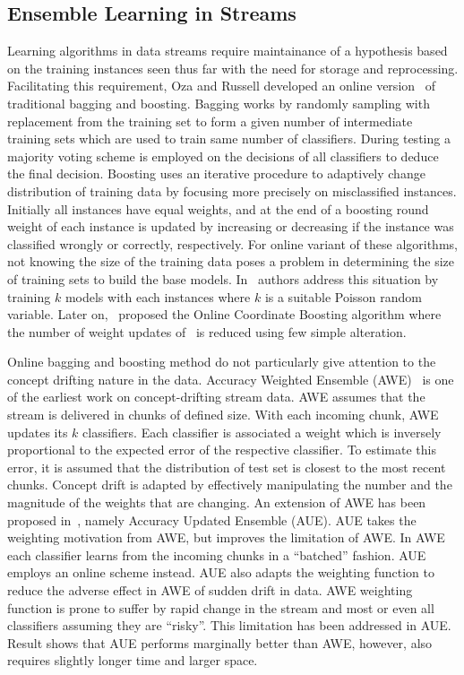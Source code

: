 \subsection{Ensemble Learning in Streams}
Learning algorithms in data streams require maintainance of a hypothesis based on the training instances seen thus far with the need for storage and reprocessing. Facilitating this requirement, Oza and Russell developed an online version~\cite{oza01:obagboost, oza01:thesis} of traditional bagging and boosting. Bagging works by randomly sampling with replacement from the training set to form a given number of intermediate training sets which are used to train same number of classifiers. During testing a majority voting scheme is employed on the decisions of all classifiers to deduce the final decision. Boosting uses an iterative procedure to adaptively change distribution of training data by focusing more precisely on misclassified instances. Initially all instances have equal weights, and at the end of a boosting round weight of each instance is updated by increasing or decreasing if the instance was classified wrongly or correctly, respectively. For online variant of these algorithms, not knowing the size of the training data poses a problem in determining the size of training sets to build the base models. In~\cite{oza01:obagboost} authors address this situation by training $k$ models with each instances where $k$ is a suitable Poisson random variable. Later on,~\cite{pelossof08:boosting} proposed the Online Coordinate Boosting algorithm where the number of weight updates of~\cite{oza01:obagboost} is reduced using few simple alteration.

Online bagging and boosting method do not particularly give attention to the concept drifting nature in the data. Accuracy Weighted Ensemble (AWE)~\cite{wang03:accuweighted} is one of the earliest work on concept-drifting stream data. AWE assumes that the stream is delivered in chunks of defined size. With each incoming chunk, AWE updates its $k$ classifiers. Each classifier is associated a weight which is inversely proportional to the expected error of the respective classifier. To estimate this error, it is assumed that the distribution of test set is closest to the most recent chunks. Concept drift is adapted by effectively manipulating the number and the magnitude of the weights that are changing. An extension of AWE has been proposed in~\cite{brzezinski11:accuupdated}, namely Accuracy Updated Ensemble (AUE). AUE takes the weighting motivation from AWE, but improves the limitation of AWE. In AWE each classifier learns from the incoming chunks in a ``batched'' fashion. AUE employs an online scheme instead. AUE also adapts the weighting function to reduce the adverse effect in AWE of sudden drift in data. AWE weighting function is prone to suffer by rapid change in the stream and most or even all classifiers assuming they are ``risky''. This limitation has been addressed in AUE. Result shows that AUE performs marginally better than AWE, however, also requires slightly longer time and larger space.

